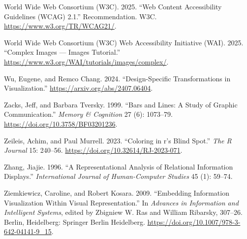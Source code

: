 \documentclass[
  letterpaper,
  DIV=11,
  numbers=noendperiod]{scrreprt}
\newlength{\cslhangindent}
\newenvironment{CSLReferences}[2] %
 {\begin{list}{}{%
  \setlength{\itemindent}{0pt}
  \setlength{\leftmargin}{0pt}
  \setlength{\parsep}{0pt}
  \ifodd #1
   \setlength{\leftmargin}{\cslhangindent}
   \setlength{\itemindent}{-1\cslhangindent}
  \fi
  \setlength{\itemsep}{#2\baselineskip}}}
 {\end{list}}
\begin{document}
\begin{CSLReferences}{1}{0}
World Wide Web Consortium (W3C). 2025. {``Web Content Accessibility
Guidelines (WCAG) 2.1.''} Recommendation. W3C.
\url{https://www.w3.org/TR/WCAG21/}.

World Wide Web Consortium (W3C) Web Accessibility Initiative (WAI).
2025. {``Complex Images --- Images Tutorial.''}
\url{https://www.w3.org/WAI/tutorials/images/complex/}.

Wu, Eugene, and Remco Chang. 2024. {``Design-Specific Transformations in
Visualization.''} \url{https://arxiv.org/abs/2407.06404}.

Zacks, Jeff, and Barbara Tversky. 1999. {``Bars and Lines: A Study of
Graphic Communication.''} \emph{Memory \& Cognition} 27 (6): 1073--79.
\url{https://doi.org/10.3758/BF03201236}.

Zeileis, Achim, and Paul Murrell. 2023. {``Coloring in r's Blind
Spot.''} \emph{The R Journal} 15: 240--56.
\url{https://doi.org/10.32614/RJ-2023-071}.

Zhang, Jiajie. 1996. {``A Representational Analysis of Relational
Information Displays.''} \emph{International Journal of Human-Computer
Studies} 45 (1): 59--74.

Ziemkiewicz, Caroline, and Robert Kosara. 2009. {``Embedding Information
Visualization Within Visual Representation.''} In \emph{Advances in
Information and Intelligent Systems}, edited by Zbigniew W. Ras and
William Ribarsky, 307--26. Berlin, Heidelberg: Springer Berlin
Heidelberg. \url{https://doi.org/10.1007/978-3-642-04141-9_15}.

\end{CSLReferences}
\end{document}
